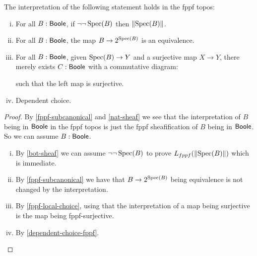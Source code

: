 \begin{theorem}
The interpretation of the following statement holds in the fppf topos:
\begin{enumerate}[(i)]
\item For all $B:\mathsf{Boole}$, if $\neg\neg\operatorname{Spec}(B)$ then $\lVert \operatorname{Spec}(B) \rVert$.
\item For all $B:\mathsf{Boole}$, the map $B\to {2}^{\operatorname{Spec}(B)}$ is an equivalence.
\item For all $B:\mathsf{Boole}$, given $\operatorname{Spec}(B)\to Y$ and a surjective map $X\to Y$, there merely exists $C:\mathsf{Boole}$ with a commutative diagram:
\begin{center}
\end{center}
such that the left map is surjective.
\item Dependent choice.
\end{enumerate}
\end{theorem}

\begin{proof}
By \cref{fppf-subcanonical} and \cref{nat-sheaf} we see that the interpretation of $B$ being in $\mathsf{Boole}$ in the fppf topos is just the fppf sheafification of $B$ being in $\mathsf{Boole}$. So we can assume $B:\mathsf{Boole}$.
\begin{enumerate}[(i)]
\item By \cref{bot-sheaf} we can assume $\neg\neg\operatorname{Spec}(B)$ to prove $L_{fppf}(\lVert \operatorname{Spec}(B) \rVert)$ which is immediate.
\item By \cref{fppf-subcanonical} we have that $B\to {2}^{\operatorname{Spec}(B)}$ being equivalence is not changed by the interpretation.
\item By \cref{fppf-local-choice}, using that the interpretation of a map being surjective is the map being fppf-surjective.
\item By \cref{dependent-choice-fppf}.
\end{enumerate}
\end{proof}

